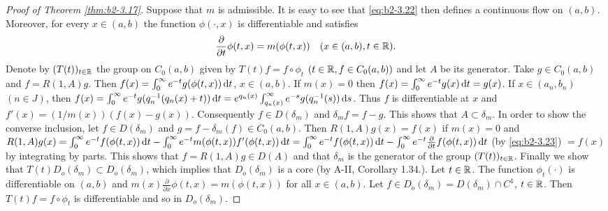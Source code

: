 \begin{proof}[Proof of Theorem \ref{thm:b2-3.17}]
Suppose that $m$ is admissible.
It is easy to see that \eqref{eq:b2-3.22} then defines a continuous flow on $(a,b)$.
Moreover, for every $x \in (a,b)$ the function $\phi(\cdot,x)$ is differentiable and satisfies
\begin{equation}\label{eq:b2-3.23}
\frac{\partial}{\partial t}\phi(t,x) = m(\phi(t,x)) \quad (x \in (a,b), t \in \mathbb{R}).
\end{equation}
Denote by $(T(t))_{t \in \mathbb{R}}$ the group on $C_{0}(a,b)$ given by $T(t)f = f \circ \phi_{t}$ $(t \in \mathbb{R}, f \in C_{0}(a,b))$ and let $A$ be its generator.
Take $g \in C_{0}(a,b)$ and $f = R(1,A)g$.
Then $f(x) = \int_{0}^{\infty} e^{-t}g(\phi(t,x)) \mathop{}\!\mathrm{d}{t}$, $x \in (a,b)$.
If $m(x) = 0$ then $f(x) = \int_{0}^{\infty} e^{-t}g(x) \mathop{}\!\mathrm{d}{t} = g(x)$.
If $x \in (a_{n},b_{n})$ $(n \in J)$, then 
$f(x) = \int_{0}^{\infty} e^{-t}g(q_{n}^{-1}(q_{n}(x) + t)) \mathop{}\!\mathrm{d}{t} = e^{q_{n}(x)} \int_{q_{n}(x)}^{\infty} e^{-s}g(q_{n}^{-1}(s)) \mathop{}\!\mathrm{d}{s}$.
Thus $f$ is differentiable at $x$ and $f'(x) = (1/m(x))(f(x) - g(x))$.
Consequently $f \in D(\delta_{m})$ and $\delta_{m}f = f - g$.
This shows that $A \subset \delta_{m}$.
In order to show the converse inclusion, let $f \in D(\delta_{m})$ and $g = f - \delta_{m}(f) \in C_{0}(a,b)$.
Then $R(1,A)g(x) = f(x)$ if $m(x) = 0$ and $R(1,A)g(x) = \int_{0}^{\infty} e^{-t}f(\phi(t,x)) \mathop{}\!\mathrm{d}{t} - \int_{0}^{\infty} e^{-t}m(\phi(t,x))f'(\phi(t,x)) \mathop{}\!\mathrm{d}{t} = \int_{0}^{\infty} e^{-t}f(\phi(t,x)) \mathop{}\!\mathrm{d}{t} - \int_{0}^{\infty} e^{-t}\frac{\partial}{\partial t}f(\phi(t,x)) \mathop{}\!\mathrm{d}{t}$ (by \eqref{eq:b2-3.23}) $= f(x)$ by integrating by parts.
This shows that $f = R(1,A)g \in D(A)$ and that $\delta_{m}$ is the generator of the group $(T(t))_{t \in \mathbb{R}}$.
Finally we show that $T(t)D_{o}(\delta_{m}) \subset D_{o}(\delta_{m})$, which implies that $D_{o}(\delta_{m})$ is a core (by A-II, Corollary 1.34.).
Let $t \in \mathbb{R}$.
The function $\phi_{t}(\cdot)$ is
differentiable on $(a,b)$ and $m(x)\frac{\partial}{\partial x}\phi(t,x) = m(\phi(t,x))$ for all $x \in (a,b)$.
Let $f \in D_{o}(\delta_{m}) = D(\delta_{m}) \cap C^{1}$, $t \in \mathbb{R}$.
Then $T(t)f = f \circ \phi_{t}$ is differentiable and so in $D_{o}(\delta_{m})$.


\end{proof}
